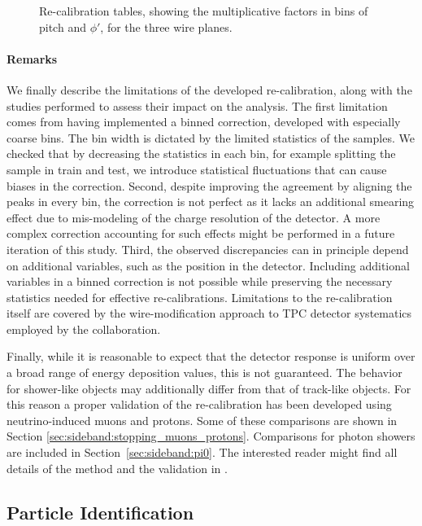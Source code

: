 \begin{figure}[H]
\begin{center}
\begin{subfigure}[b]{0.30\textwidth}
    \end{subfigure}
\caption{Re-calibration tables, showing the multiplicative factors in bins of pitch and $\phi'$, for the three wire planes.}
\label{fig:recalibration_tables}
\end{center}
\end{figure}

\paragraph{Remarks}
We finally describe the limitations of the developed re-calibration, along with the studies performed to assess their impact on the analysis.
The first limitation comes from having implemented a binned correction, developed with especially coarse bins. The bin width is dictated by the limited statistics of the samples. We checked that by decreasing the statistics in each bin, for example splitting the sample in train and test, we introduce statistical fluctuations that can cause biases in the correction.
Second, despite improving the agreement by aligning the \dqdx peaks in every bin, the correction is not perfect as it lacks an additional smearing effect due to mis-modeling of the charge resolution of the detector. A more complex correction accounting for such effects might be performed in a future iteration of this study.
Third, the observed discrepancies can in principle depend on additional variables, such as the position in the detector.
Including additional variables in a binned correction is not possible while preserving the necessary statistics needed for effective re-calibrations. Limitations to the re-calibration itself are covered by the wire-modification approach to TPC detector systematics employed by the collaboration.

Finally, while it is reasonable to expect that the detector response is uniform over a broad range of energy deposition values, this is not guaranteed. 
The behavior for shower-like objects may additionally differ from that of track-like objects.
For this reason a proper validation of the re-calibration has been developed using neutrino-induced muons and protons.
Some of these comparisons are shown in Section \ref{sec:sideband:stopping_muons_protons}. Comparisons for photon showers are included in Section~\ref{sec:sideband:pi0}.
The interested reader might find all details of the method and the validation in \cite{bib:pid_internal_note}.

\subsection{Particle Identification}
\label{sec:particleid}

